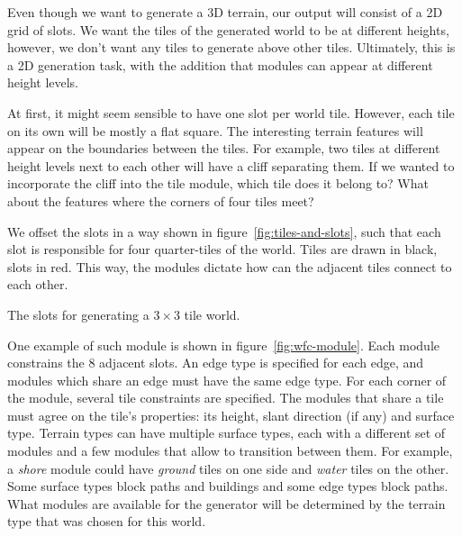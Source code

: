 Even though we want to generate a 3D terrain, our output will consist of a 2D grid of slots.
We want the tiles of the generated world to be at different heights, however, we don't want any tiles to generate above other tiles.
Ultimately, this is a 2D generation task, with the addition that modules can appear at different height levels.

At first, it might seem sensible to have one slot per world tile.
However, each tile on its own will be mostly a flat square.
The interesting terrain features will appear on the boundaries between the tiles.
For example, two tiles at different height levels next to each other will have a cliff separating them.
If we wanted to incorporate the cliff into the tile module, which tile does it belong to?
What about the features where the corners of four tiles meet?

We offset the slots in a way shown in figure~\ref{fig:tiles-and-slots}, such that each slot is responsible for four quarter-tiles of the world.
Tiles are drawn in black, slots in red.
This way, the modules dictate how can the adjacent tiles connect to each other.

\begin{center}
    \captionsetup{type=figure}
    \caption{The slots for generating a $3\times3$ tile world.}
    \label{fig:tiles-and-slots}
\end{center}

One example of such module is shown in figure~\ref{fig:wfc-module}.
Each module constrains the 8 adjacent slots.
An edge type is specified for each edge, and modules which share an edge must have the same edge type.
For each corner of the module, several tile constraints are specified.
The modules that share a tile must agree on the tile's properties: its height, slant direction (if any) and surface type.
Terrain types can have multiple surface types, each with a different set of modules and a few modules that allow to transition between them.
For example, a \emph{shore} module could have \emph{ground} tiles on one side and \emph{water} tiles on the other.
Some surface types block paths and buildings and some edge types block paths.
What modules are available for the generator will be determined by the terrain type that was chosen for this world.

